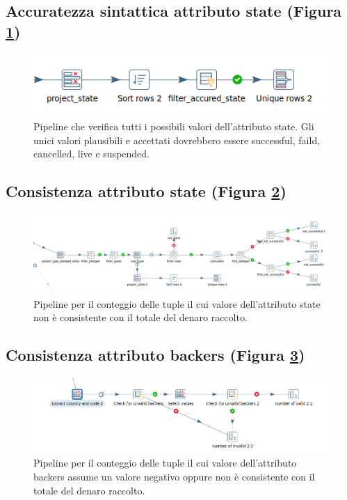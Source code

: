 \subsection{Accuratezza sintattica attributo state (Figura \ref{fig:dqstateaccuracy})}

\begin{figure}[h!]
	\centering
	\includegraphics[width=0.7\linewidth]{images/DQ_stateaccuracy}
	\caption{Pipeline che verifica tutti i possibili valori dell'attributo state. Gli unici valori plausibili e accettati dovrebbero essere successful, faild, cancelled, live e suspended.}
	\label{fig:dqstateaccuracy}
\end{figure}


\subsection{Consistenza attributo state (Figura \ref{fig:dqstateaconsistency})}

\begin{figure}[h!]
	\centering
	\includegraphics[width=0.7\linewidth]{images/DQ_stateaconsistency}
	\caption{Pipeline per il conteggio delle tuple il cui valore dell'attributo state non è consistente con il totale del denaro raccolto.}
	\label{fig:dqstateaconsistency}
\end{figure}


\subsection{Consistenza attributo backers (Figura \ref{fig:dqbackersconsistency})}

\begin{figure}[h!]
	\centering
	\includegraphics[width=0.7\linewidth]{images/DQ_backersconsistency}
	\caption{Pipeline per il conteggio delle tuple il cui valore dell'attributo backers assume un valore negativo oppure non è consistente con il totale del denaro raccolto.}
	\label{fig:dqbackersconsistency}
\end{figure}


